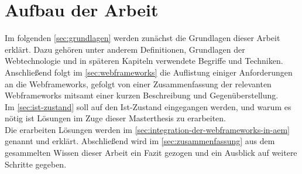 \section{Aufbau der Arbeit}
Im folgenden \autoref{sec:grundlagen} werden zunächst die Grundlagen dieser Arbeit erklärt. Dazu gehören unter anderem Definitionen, Grundlagen der Webtechnologie und in späteren Kapiteln verwendete Begriffe und Techniken.\\
Anschließend folgt im \autoref{sec:webframeworks} die Auflistung einiger Anforderungen an die Webframeworks, gefolgt von einer Zusammenfassung der relevanten Webframeworks mitsamt einer kurzen Beschreibung und Gegenüberstellung.\\
Im \autoref{sec:ist-zustand} soll auf den Ist-Zustand eingegangen werden, und warum es nötig ist Lösungen im Zuge dieser Masterthesis zu erarbeiten. \\ 
Die erarbeiten Lösungen werden im \autoref{sec:integration-der-webframeworks-in-aem} genannt und erklärt.
Abschließend wird im \autoref{sec:zusammenfassung} aus dem gesammelten Wissen dieser Arbeit ein Fazit gezogen und ein Ausblick auf weitere Schritte gegeben.